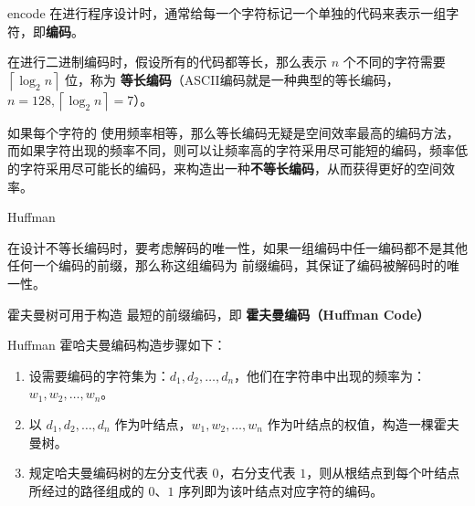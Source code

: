 \documentclass[10pt]{ctexbeamer}
\begin{document}
\begin{frame}{encode}
  在进行程序设计时，通常给每一个字符标记一个单独的代码来表示一组字符，即\textbf{编码}。

在进行二进制编码时，假设所有的代码都等长，那么表示 $n$ 个不同的字符需要 $\left \lceil \log_2 n \right \rceil$ 位，称为 \textbf{等长编码}（ASCII编码就是一种典型的等长编码，$n=128,\left \lceil \log_2 n \right \rceil = 7$）。

如果每个字符的 使用频率相等，那么等长编码无疑是空间效率最高的编码方法，而如果字符出现的频率不同，则可以让频率高的字符采用尽可能短的编码，频率低的字符采用尽可能长的编码，来构造出一种\textbf{不等长编码}，从而获得更好的空间效率。

\end{frame}
\begin{frame}{Huffman}

在设计不等长编码时，要考虑解码的唯一性，如果一组编码中任一编码都不是其他任何一个编码的前缀，那么称这组编码为 前缀编码，其保证了编码被解码时的唯一性。

霍夫曼树可用于构造 最短的前缀编码，即 \textbf{霍夫曼编码（Huffman Code）}
\end{frame}

\begin{frame}{Huffman}
 霍哈夫曼编码构造步骤如下：
\begin{enumerate}
  \item 设需要编码的字符集为：$d_1,d_2,\dots,d_n$，他们在字符串中出现的频率为：$w_1,w_2,\dots,w_n$。
  \item 以 $d_1,d_2,\dots,d_n$ 作为叶结点，$w_1,w_2,\dots,w_n$ 作为叶结点的权值，构造一棵霍夫曼树。
  \item 规定哈夫曼编码树的左分支代表 $0$，右分支代表 $1$，则从根结点到每个叶结点所经过的路径组成的 $0$、$1$ 序列即为该叶结点对应字符的编码。
\end{enumerate}
\end{frame}
\end{document}
